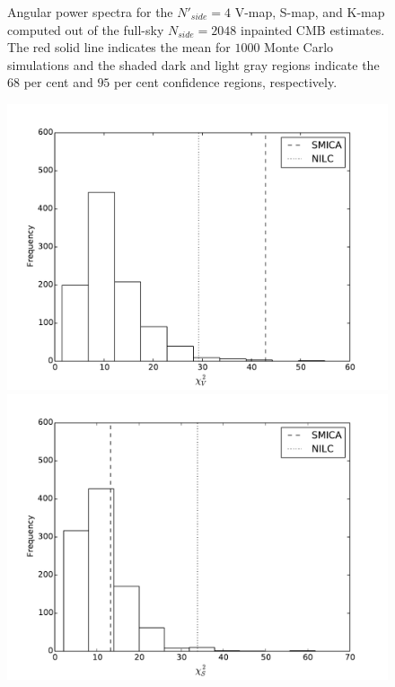 \begin{figure}
\caption{Angular power spectra for the $N'_{side} = 4$ V-map, S-map, and K-map computed out of the full-sky $N_{side} = 2048$ inpainted CMB estimates. The red solid line indicates the mean for $1000$ Monte Carlo simulations and the shaded dark and light gray regions indicate the $68$ per cent and $95$ per cent confidence regions, respectively.}
\label{Fig:1}
\end{figure}

\begin{figure}
\centering
\includegraphics[scale=0.3]{figures/chapter-vsk/vchi2.pdf}
\includegraphics[scale=0.3]{figures/chapter-vsk/schi2.pdf}\\

\end{figure}
